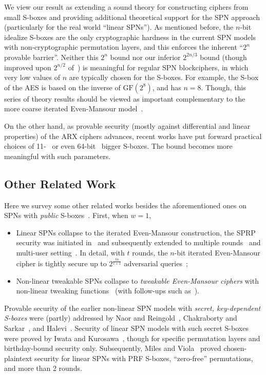 We view our result as extending a sound theory for constructing ciphers from small S-boxes and providing additional theoretical support for the SPN approach (particularly for the real world ``linear SPNs''). As mentioned before, the $n$-bit idealize S-boxes are the only cryptographic hardness in the current SPN models with non-cryptographic permutation layers, and this enforces the inherent ``$2^n$ provable barrier''. Neither this $2^n$ bound nor our inferior $2^{2n/3}$ bound (though improved upon $2^{n/2}$ of~\cite{C:CDKLST18}) is meaningful for regular SPN blockciphers, in which very low values of $n$ are typically chosen for the S-boxes. For example, the S-box of the AES is based on the inverse of $\text{GF}(2^8)$, and has $n=8$.
Though, this series of theory results should be viewed as important complementary to the more coarse iterated Even-Mansour model~\cite{EC:BKLSST12}.

On the other hand, as provable security (mostly against differential and linear properties) of the ARX ciphers advances, recent works have put forward practical choices of 11-~\cite{DBLP:journals/tosc/16-bit-Sbox} or even 64-bit~\cite{cryptoeprint:2019:1378} bigger S-boxes. The bound becomes more meaningful with such parameters.




\subsection{Other Related Work}


Here we survey some other related works besides the aforementioned ones on SPNs with {\it public} S-boxes~\cite{EC:DSSL16,EPRINT:DKSTZ17,EPRINT:CogLee18,C:CDKLST18}. First, when $w=1$,
%
\begin{itemize}
	\item Linear SPNs collapse to the iterated Even-Mansour construction, the SPRP security was initiated in~\cite{JC:EveMan97} and subsequently extended to multiple rounds~\cite{EC:BKLSST12,EPRINT:Steinberger12,AC:LamPatSeu12,EC:CheSte14,JC:CLLSS18,C:HoaTes16} and multi-user setting~\cite{C:HoaTes16}. In detail, with $t$ rounds, the $n$-bit iterated Even-Mansour cipher is tightly secure up to $2^{\frac{tn}{t+1}}$ adversarial queries~\cite{EC:BKLSST12,EC:CheSte14,C:HoaTes16};
	\item Non-linear tweakable SPNs collapse to {\it tweakable Even-Mansour ciphers} with non-linear tweaking functions~\cite{C:CogLamSeu15} (with follow-ups such as~\cite{AC:CogSeu15,EC:GJMN16,C:Mennink16}).
\end{itemize}
%
Provable security of the earlier non-linear SPN models with {\it secret, key-dependent S-boxes} were (partly) addressed by Naor and Reingold~\cite{JC:NaoRei99}, Chakraborty and Sarkar~\cite{FSE:ChaSar06}, and Halevi~\cite{C:Halevi07}. Security of linear SPN models with such secret S-boxes were proved by Iwata and Kurosawa~\cite{FSE:IwaKur00}, though for specific permutation layers and birthday-bound security only. Subsequently, Miles and Viola~\cite{miles2015substitution} proved chosen-plaintext security for linear SPNs with PRF S-boxes, ``zero-free'' permutations, and more than 2 rounds.


